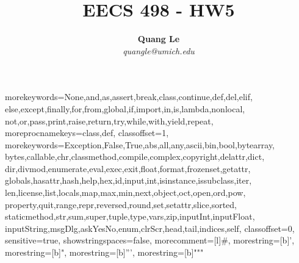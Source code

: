 \documentclass[a4paper, 12pt]{article}
\begin{document}
\title{\textbf{EECS 498 - HW5}}
\author{\textbf{Quang Le} \\ \textit{quangle@umich.edu}}
\date{}
\maketitle

\begin{sloppypar}


%
  { morekeywords={None,and,as,assert,break,class,continue,def,del,elif,%
      else,except,finally,for,from,global,if,import,in,is,lambda,nonlocal,%
      not,or,pass,print,raise,return,try,while,with,yield,repeat},%
    moreprocnamekeys={class,def},%
    classoffset=1,%
    morekeywords={Exception,False,True,abs,all,any,ascii,bin,bool,bytearray,%
      bytes,callable,chr,classmethod,compile,complex,copyright,delattr,dict,%
      dir,divmod,enumerate,eval,exec,exit,float,format,frozenset,getattr,%
      globals,hasattr,hash,help,hex,id,input,int,isinstance,issubclass,iter,%
      len,license,list,locals,map,max,min,next,object,oct,open,ord,pow,%
      property,quit,range,repr,reversed,round,set,setattr,slice,sorted,%
      staticmethod,str,sum,super,tuple,type,vars,zip,inputInt,inputFloat,%
      inputString,msgDlg,askYesNo,enum,clrScr,head,tail,indices,self},%
    classoffset=0,%
    sensitive=true,%
    showstringspaces=false,%
    morecomment=[l]\#,%
    morestring=[b]',%
    morestring=[b]",%
    morestring=[b]{'''},%
    morestring=[b]{"""}%
  }


\end{sloppypar}
\end{document}
